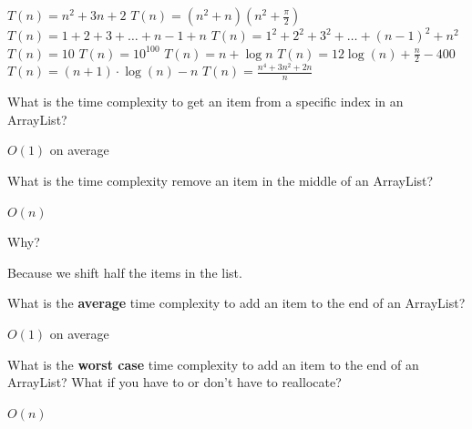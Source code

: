 \documentclass[letter,answers,addpoints]{exam}
\begin{document}
	\begin{questions}
		
		
		
		
		
		\question[2]  $T(n)= n^2 +3n +2$	\answerline[$ O(n^2) $]
		\question[2]  $T(n)= (n^2 + n)(n^2 + \frac{\pi}{2}) $	\answerline[$ O(n^4) $]
		\question[2]  $T(n)= 1 + 2 + 3 + \dots + n-1 + n$	\answerline[$ O(n^2) $]
		\question[2]  $T(n)= 1^{2} + 2^{2} + 3^{2} + \dots + (n-1)^{2} + n^{2}$	\answerline[$ O(n^3) $]
		\question[2]  $T(n)= 10$	\answerline[$ O(1) $]
		\question[2]  $T(n)= 10^{100}$	\answerline[$ O(1) $]
		\question[2]  $T(n)= n + \log n$	\answerline[$ O(n) $]
		\question[2]  $T(n)= 12\log(n) + \frac{n}{2} - 400$	\answerline[$ O(n) $]
		\question[2]  $T(n)= (n+1)\cdot\log(n) - n $	\answerline[$ O(n\log(n)) $]
		\question[2]  $T(n)= \frac{n^4 +3n^2 +2n}{n}$	\answerline[$ O(n^4) $]
		
		
		\newpage 

	
		\question[4] What is the time complexity to  get an item from a specific index in an ArrayList?
		\begin{solution}[\stretch{1}]
			$ O(1) $ on average	
		\end{solution}


		\question[3] What is the time complexity remove an item in the middle of an ArrayList?
		\begin{solution}[\stretch{1}]
			$ O(n) $
		\end{solution}
		
		\question[3] Why?
		\begin{solution}[\stretch{1}]
		Because we shift half the items in the list.
		\end{solution}
		
		
		
		\question[3] What is the \textbf{average} time complexity to add an item to the end of an ArrayList?
		\begin{solution}[\stretch{1}]
		$ O(1) $ on average	
		\end{solution}
		
		
		\question[3] What is the \textbf{worst case} time complexity to add an item to the end of an ArrayList?  What if you have to or don't have to reallocate?
		
		\begin{solution}[\stretch{1}]
		$ O(n) $	
		\end{solution}
		

\end{questions}
\end{document}
